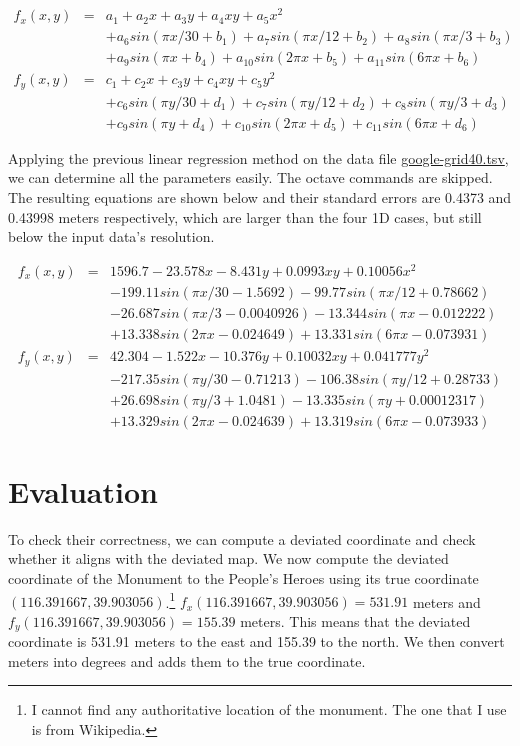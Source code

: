 \documentclass[a4paper]{article}
\begin{document}
\begin{eqnarray}
\label{eq:fxp}
f_x(x,y) &=& a_1+a_2x+a_3y+a_4xy+a_5x^2 \nonumber \\
         & & +a_6sin(\pi x/30+b_1) +a_7sin(\pi x/12+b_2)+a_8sin(\pi x/3+b_3) \nonumber \\
         & & +a_9sin(\pi x+b_4)+a_{10}sin(2\pi x +b_5) +a_{11}sin(6\pi x+b_6) \\
\label{eq:fyp}
f_y(x,y) &=& c_1 +c_2x +c_3y +c_4xy +c_5y^2 \nonumber \\
         & & +c_6sin(\pi y/30+d_1)+c_7sin(\pi y/12 +d_2)+c_8sin(\pi y/3+d_3) \nonumber \\
         & & +c_9sin(\pi y+d_4)+c_{10}sin(2\pi x+d_5) +c_{11}sin(6\pi x +d_6)
\end{eqnarray}

Applying the previous linear regression method on the data file
\url{google-grid40.tsv}, we can determine all the parameters easily.
The octave commands are skipped.
The resulting equations are shown below and their standard errors are 0.4373
and 0.43998 meters respectively, which are larger than the
four 1D cases, but still below the input data's resolution.

\begin{eqnarray}
f_x(x,y) &=& 1596.7-23.578x -8.431y +0.0993xy +0.10056x^2 \nonumber \\
          & & -199.11sin(\pi x/30-1.5692) -99.77sin(\pi x/12+0.78662) \nonumber \\
          & & -26.687sin(\pi x/3-0.0040926) -13.344sin(\pi x-0.012222) \nonumber \\
          & & +13.338sin(2\pi x -0.024649) +13.331sin(6\pi x-0.073931) \\
f_y(x,y) &=& 42.304 -1.522x -10.376y +0.10032xy +0.041777y^2 \nonumber \\
         & & -217.35sin(\pi y/30 -0.71213)-106.38sin(\pi y/12 +0.28733) \nonumber \\
         & & +26.698sin(\pi y/3+1.0481) -13.335sin(\pi y+0.00012317) \nonumber \\
         & & +13.329sin(2\pi x-0.024639) +13.319sin(6\pi x -0.073933)
\end{eqnarray}

\section{Evaluation}

To check their correctness, we can compute a deviated coordinate and check
whether it aligns with the deviated map.
We now compute the deviated coordinate of the Monument to the People's Heroes
using its true coordinate $(116.391667,39.903056)$.\footnote{
I cannot find any authoritative location of the monument.
The one that I use is from Wikipedia.
}
$f_x(116.391667,39.903056)=531.91$ meters and
$f_y(116.391667,\allowbreak{}39.903056)=155.39$ meters.
This means that the deviated coordinate is 531.91 meters to the east and 155.39
to the north.
We then convert meters into degrees and adds them to the true coordinate.
\end{document}
